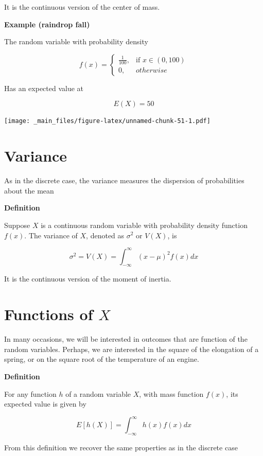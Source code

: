 \documentclass[
]{book}
\begin{document}
It is the continuous version of the center of mass.

\textbf{Example (raindrop fall)}

The random variable with probability density

\[
    f(x)= 
\begin{cases}
    \frac{1}{100},& \text{if } x\in (0,100)\\
    0,& otherwise 
\end{cases}
\]

Has an expected value at

\[E(X)=50\]

\texttt{[image: \_main\_files/figure-latex/unnamed-chunk-51-1.pdf]}

\hypertarget{variance-1}{%
\section{Variance}\label{variance-1}}

As in the discrete case, the variance measures the dispersion of probabilities about the mean

\textbf{Definition}

Suppose \(X\) is a continuous random variable with probability density function \(f(x)\). The variance of \(X\), denoted as \(\sigma^2\) or \(V(X)\), is

\[\sigma^2=V(X)=\int_{-\infty}^\infty (x-\mu)^2 f(x) dx\]

It is the continuous version of the moment of inertia.

\hypertarget{functions-of-x}{%
\section{\texorpdfstring{Functions of \(X\)}{Functions of X}}\label{functions-of-x}}

In many occasions, we will be interested in outcomes that are function of the random variables. Perhaps, we are interested in the square of the elongation of a spring, or on the square root of the temperature of an engine.

\textbf{Definition}

For any function \(h\) of a random variable \(X\), with mass function \(f(x)\), its expected value is given by

\[E[h(X)]= \int_{-\infty}^{\infty} h(x) f(x)dx\]

From this definition we recover the same properties as in the discrete case
\end{document}
